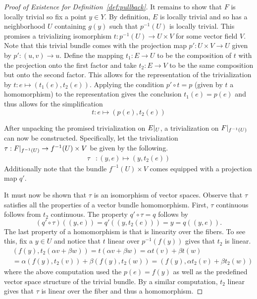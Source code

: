 \documentclass[../../sean_thesis.tex]{subfiles}
\begin{document}
\begin{proof}[Proof of Existence for Definition~\ref{def:pullback}]
It remains to show that $F$ is locally trivial so fix a point $y \in Y$. By definition, $E$ is locally trivial and so has a neighborhood $U$ containing $g(y)$ such that $p^{-1}(U)$ is locally trivial. This promises a trivializing isomorphism $t: p^{-1}(U) \to U \times V$ for some vector field $V$. Note that this trivial bundle comes with the projection map $p': U \times V \to U$ given by $p': (u,v) \to u$. Define the mapping $t_1: E \to U$ to be the composition of $t$ with the projection onto the first factor and take $t_2: E \to V$ to be the same composition but onto the second factor. This allows for the representation of the trivialization by $t: e \mapsto (t_1(e), t_2(e))$. Applying the condition $p' \circ t = p$ (given by $t$ a homomorphism) to the representation gives the conclusion $t_1(e) = p(e)$ and thus allows for the simplification
\begin{equation*}
	t: e \mapsto (p(e), t_2(e))
\end{equation*}

After unpacking the promised trivialization on ${E} \vert_{U}$, a trivialization on ${F} \vert_{f^{-1}(U)}$ can now be constructed. Specifically, let the trivialization $\tau: {F} \vert_{f^{-1}(U)} \to f^{-1}(U) \times V$ be given by the following.
\begin{align*}
	\tau&: (y,e) \mapsto (y, t_2(e))
\end{align*}
Additionally note that the bundle $f^{-1}(U) \times V$ comes equipped with a projection map $q'$. 

It must now be shown that $\tau$ is an isomorphism of vector spaces. Observe that $\tau$ satisfies all the properties of a vector bundle homomorphism. First, $\tau$ continuous follows from $t_2$ continuous. The property $q' \circ \tau = q$ follows by
\begin{equation*}
	(q' \circ \tau)((y,e)) = q'((y,t_2(e))) = y = q((y,e)).
\end{equation*}
The last property of a homomorphism is that is linearity  over the fibers. To see this, fix a $y \in U$ and notice that $t$ linear over $p^{-1}(f(y))$ gives that $t_2$ is linear.
\begin{align*}
  &(f(y), t_2(\alpha v + \beta w))
= t(\alpha v + \beta w)
= \alpha t(v) + \beta t(w) \\
&= \alpha(f(y), t_2(v)) + \beta(f(y), t_2(w))
= (f(y), \alpha t_2(v) + \beta t_2(w))
\end{align*}
where the above computation used the $p(e) = f(y)$ as well as the predefined vector space structure of the trivial bundle. By a similar computation, $t_2$ linear gives that $\tau$ is linear over the fiber and thus a homomorphism.


\end{proof}
\end{document}
